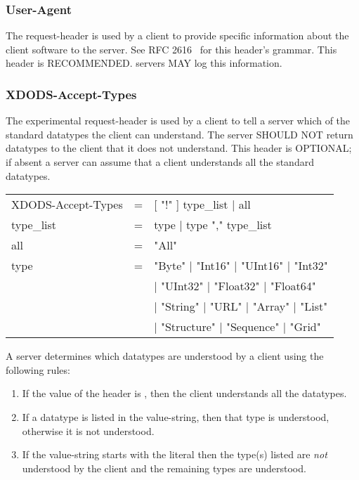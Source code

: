 \documentclass[justify]{dods-paper}
\begin{document}
\subsubsection{User-Agent}
\label{sec-user-agent}

The  request-header is used by a \DAP client to
provide specific information about the client software to the \DAP
server. See RFC 2616~\cite{rfc2616} for this header's grammar. This header is
RECOMMENDED. \DAP servers MAY log this information.

\subsubsection{XDODS-Accept-Types}
\label{sec-accept-types}

The  experimental request-header is used by a
\DAP client to tell a \DAP server which of the standard \DAP
datatypes the client can understand. The server SHOULD NOT return datatypes
to the client that it does not understand. This header is OPTIONAL; if absent
a server can assume that a client understands all the standard datatypes. 

\begin{ttfamily}
\begin{center}
\begin{tabular}{lll}
XDODS-Accept-Types & = & [ "!" ] type\_list | all \\
type\_list & = & type | type "," type\_list \\
all & = & "All" \\
type & = & "Byte" | "Int16" | "UInt16" | "Int32" \\
       & & | "UInt32" | "Float32" | "Float64" \\
       & & | "String" | "URL" | "Array" | "List" \\ 
       & & | "Structure" | "Sequence" | "Grid" \\
\end{tabular}
\end{center}
\end{ttfamily}

A \DAP server determines which datatypes are understood by a client using
the following rules:
\begin{enumerate}
\item If the value of the header is , then the client understands
  all the datatypes.
\item If a datatype is listed in the value-string, then that type is
  understood, otherwise it is not understood.
\item If the value-string starts with the literal \lit{!} then the type(s)
  listed are \emph{not} understood by the client and the remaining types are
  understood. 
\end{enumerate}
\end{document}
